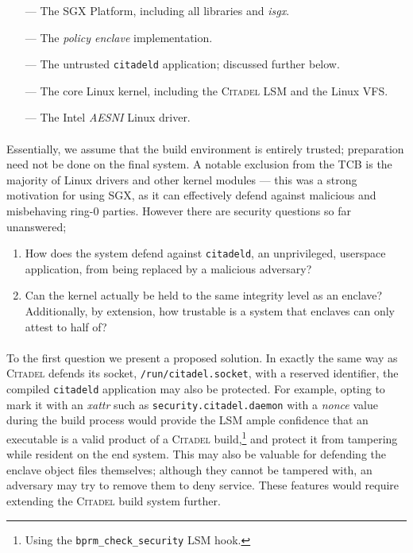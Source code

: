 \begin{itemize}
    \item[---] The SGX Platform, including all libraries and \textit{isgx}. 
    \item[---] The \textit{policy enclave} implementation.
    \item[---] The untrusted \texttt{citadeld} application; discussed further below.
    \item[---] The core Linux kernel, including the \textsc{Citadel} LSM and the Linux VFS.   
    \item[---] The Intel \textit{AESNI} Linux driver. 
\end{itemize}

\paragraph{} Essentially, we assume that the build environment is entirely trusted; preparation need not be done on the final system. A notable exclusion from the TCB is the majority of Linux drivers and other kernel modules --- this was a strong motivation for using SGX, as it can effectively defend against malicious and misbehaving ring-0 parties. However there are security questions so far unanswered;

\begin{enumerate}
    \item How does the system defend against \texttt{citadeld}, an unprivileged, userspace application, from being replaced by a malicious adversary?
    \item Can the kernel actually be held to the same integrity level as an enclave? Additionally, by extension, how trustable is a system that enclaves can only attest to half of?
\end{enumerate}

\paragraph{} To the first question we present a proposed solution. In exactly the same way as \textsc{Citadel} defends its socket, \texttt{/run/citadel.socket}, with a reserved identifier, the compiled \texttt{citadeld} application may also be protected. For example, opting to mark it with an \textit{xattr} such as \texttt{security.citadel.daemon} with a \textit{nonce} value during the build process would provide the LSM ample confidence that an executable is a valid product of a \textsc{Citadel} build,\footnote{Using the \texttt{bprm\_check\_security} LSM hook.} and protect it from tampering while resident on the end system. This may also be valuable for defending the enclave object files themselves; although they cannot be tampered with, an adversary may try to remove them to deny service. These features would require extending the \textsc{Citadel} build system further.


